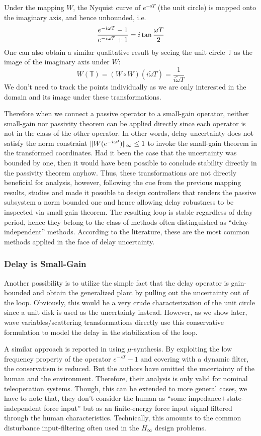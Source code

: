 Under the mapping $W$, the Nyquist curve of $e^{-sT}$ (the unit circle) is mapped onto the imaginary axis, 
and hence unbounded, i.e.
\[
\frac{e^{-i\omega T}-1}{e^{-i\omega T}+1} = i\tan{\frac{\omega T}{2}}
\]
One can also obtain a similar qualitative result by seeing the unit circle $\mathbb{T}$ as the image of 
the imaginary axis under $W$: 
\[
W(\mathbb{T}) = (W\circ W)(i\widetilde{\omega} T) = \frac{1}{i\widetilde{\omega} T}
\]
We don't need to track the points individually as we are only interested in the domain and its image
under these transformations. 


Therefore when we connect a passive operator to a small-gain operator, neither small-gain nor passivity theorem
can be applied directly since each operator is not in the class of the other operator. In other words, delay 
uncertainty does not satisfy the norm constraint $\|W(e^{-i\omega t})\|_\infty \leq 1$ to invoke the small-gain 
theorem in the transformed coordinates. Had it been the case that the uncertainty was bounded by one, then it 
would have been possible to conclude stability directly in the passivity theorem anyhow. Thus, these transformations 
are not directly beneficial for analysis, however, following the cue from the previous mapping results, studies 
\cite{andersonspong} and \cite{nieslotine} made it possible to design controllers that renders the passive subsystem 
a norm bounded one and hence allowing delay robustness to be inspected via small-gain theorem. The resulting 
loop is stable regardless of delay period, hence they belong to the class of methods often distinguished
as \enquote{delay-independent} methods. According to the literature, these are the most common methods
applied in the face of delay uncertainty.

\subsubsection{Delay is Small-Gain}
Another possibility is to utilize the simple fact that the delay operator is gain-bounded and obtain the 
generalized plant by pulling out the uncertainty out of the loop. Obviously, this would be a very crude
characterization of the unit circle since a unit disk is used as the uncertainty instead. However, as 
we show later, wave variables/scattering transformations directly use this conservative formulation to 
model the delay in the stabilization of the loop.

A similar approach is reported in \cite{leungfa} using $\mu$-synthesis. By exploiting the
low frequency property of the operator $e^{-sT}-1$ and covering with a dynamic filter, the conservatism
is reduced. But the authors have omitted the uncertainty of the human and the environment. Therefore, 
their analysis is only valid for nominal teleoperation systems. Though, this can be extended to more 
general cases, we have to note that, they don't consider the human as \enquote{some impedance$+$state-independent 
force input} but as an finite-energy force input signal filtered through the human characteristics. 
Technically, this amounts to the common disturbance input-filtering often used in the $H_\infty$ design problems. 

